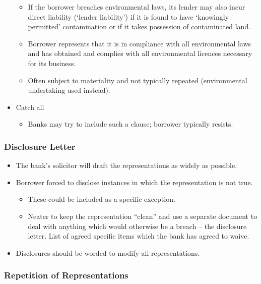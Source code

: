 \documentclass[
]{article}
\providecommand{\tightlist}{%
  \setlength{\itemsep}{0pt}\setlength{\parskip}{0pt}}
\begin{document}
\begin{itemize}
  \begin{itemize}
  \tightlist
  \item
    If the borrower breaches environmental laws, its lender may also
    incur direct liability (`lender liability') if it is found to have
    `knowingly permitted' contamination or if it takes possession of
    contaminated land.
  \item
    Borrower represents that it is in compliance with all environmental
    laws and has obtained and complies with all environmental licences
    necessary for its business.
  \item
    Often subject to materiality and not typically repeated
    (environmental undertaking used instead).
  \end{itemize}
\item
  Catch all

  \begin{itemize}
  \tightlist
  \item
    Banks may try to include such a clause; borrower typically resists.
  \end{itemize}
\end{itemize}

\hypertarget{disclosure-letter}{%
\subsubsection{Disclosure Letter}\label{disclosure-letter}}

\begin{itemize}
\tightlist
\item
  The bank's solicitor will draft the representations as widely as
  possible.
\item
  Borrower forced to disclose instances in which the representation is
  not true.

  \begin{itemize}
  \tightlist
  \item
    These could be included as a specific exception.
  \item
    Neater to keep the representation ``clean'' and use a separate
    document to deal with anything which would otherwise be a breach --
    the disclosure letter. List of agreed specific items which the bank
    has agreed to waive.
  \end{itemize}
\item
  Disclosures should be worded to modify all representations.
\end{itemize}

\hypertarget{repetition-of-representations}{%
\subsubsection{Repetition of
Representations}\label{repetition-of-representations}}
\end{document}
